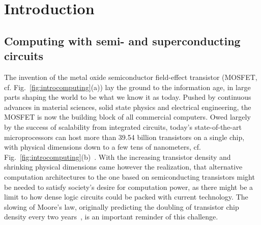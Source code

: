 \newchapstyle
\chapter{Introduction}
\label{chap:intro}



\afterpage{\pagecolor{none}}\newpage

\section{Computing with semi- and superconducting circuits}

The invention of the metal oxide semiconductor field-effect transistor (MOSFET, cf. Fig.~\ref{fig:introcomputing}(a)) lay the ground to the information age, in large parts shaping the world to be what we know it as today.
%
Pushed by continuous advances in material sciences, solid state physics and electrical engineering, the MOSFET is now the building block of all commercial computers.
%
Owed largely by the success of scalability from integrated circuits, today's state-of-the-art microprocessors can host more than 39.54 billion transistors on a single chip, with physical dimensions down to a few tens of nanometers, cf. Fig.~\ref{fig:introcomputing}(b)~\cite{mujtabaAMDEPYCRome2019}.
%
With the increasing transistor density and shrinking physical dimensions came however the realization, that alternative computation architectures to the one based on semiconducting transistors might be needed to satisfy society's desire for computation power, as there might be a limit to how dense logic circuits could be packed with current technology.
%
The slowing of Moore's law, originally predicting the doubling of transistor chip density every two years~\cite{mooreCrammingMoreComponents2006}, is an important reminder of this challenge.


